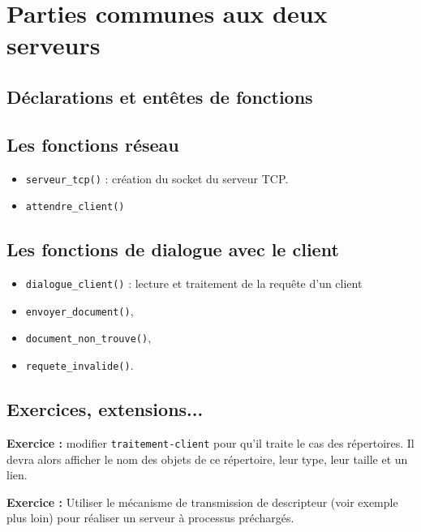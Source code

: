 \section{Parties communes aux deux serveurs}

\subsection{Déclarations et entêtes de fonctions}

\source



\subsection{Les fonctions réseau}
\begin{itemize}
\item  \texttt{serveur\_tcp()} : création du socket du serveur TCP.
\item \texttt{attendre\_client()}
\end{itemize}

 
\source



\subsection{Les fonctions de dialogue avec le client}
\begin{itemize}
\item \texttt{dialogue\_client()} : lecture et traitement de la requête d'un client
\item \texttt{envoyer\_document()},
\item \texttt{document\_non\_trouve()},
\item \texttt{requete\_invalide()}.
\end{itemize}

 
\source



\subsection{Exercices, extensions...}

\textbf{Exercice : } modifier \texttt{traitement-client} pour
qu'il traite le cas des répertoires. Il devra alors afficher
le nom des objets de ce répertoire, leur type, leur taille
et un lien.

\textbf{Exercice : } Utiliser le mécanisme de transmission
de descripteur (voir exemple plus loin) pour réaliser un serveur
à processus préchargés.
